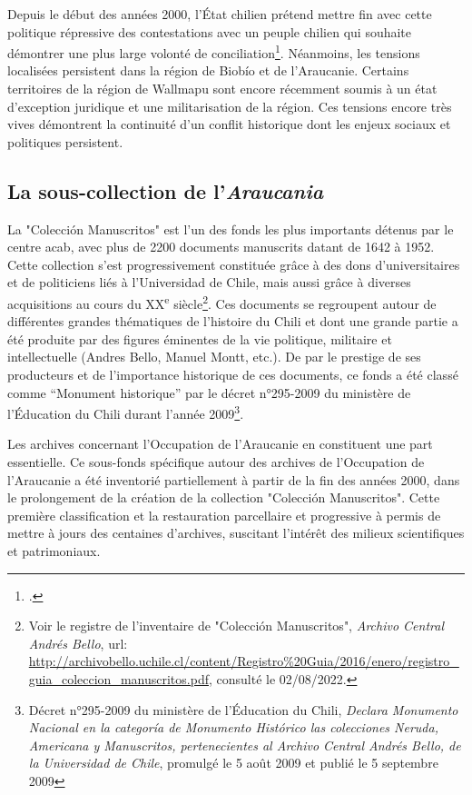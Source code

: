 	Depuis le début des années 2000, l'État chilien prétend mettre fin avec cette politique répressive des contestations avec un peuple chilien qui souhaite démontrer une plus large volonté de conciliation\footcite{nouailleIndependanceChiliConsequences2012}. Néanmoins, les tensions localisées persistent dans la région de Biobío et de l'Araucanie. Certains territoires de la région de Wallmapu sont encore récemment soumis à un état d'exception juridique et une militarisation de la région. Ces tensions encore très vives démontrent la continuité d'un conflit historique dont les enjeux sociaux et politiques persistent.
	    
    \subsection{La sous-collection de l'\textit{Araucania}}
    
    La "Colección Manuscritos" est l'un des fonds les plus importants détenus par le centre \gls{acab}, avec plus de 2200 documents manuscrits datant de 1642 à 1952. Cette collection s'est progressivement constituée grâce à des dons d'universitaires et de politiciens liés à l'Universidad de Chile, mais aussi grâce à diverses acquisitions au cours du XX\textsuperscript{e} siècle\footnote{Voir le registre de l'inventaire de "Colección Manuscritos", \textit{Archivo Central Andrés Bello}, url: \url{http://archivobello.uchile.cl/content/Registro\%20Guia/2016/enero/registro_guia_coleccion_manuscritos.pdf}, consulté le 02/08/2022.}. Ces documents se regroupent autour de différentes grandes thématiques de l'histoire du Chili et dont une grande partie a été produite par des figures éminentes de la vie politique, militaire et intellectuelle (Andres Bello, Manuel Montt, etc.). De par le prestige de ses producteurs et de l'importance historique de ces documents, ce fonds a été classé comme \enquote{Monument historique} par le décret n°295-2009 du ministère de l'Éducation du Chili durant l'année 2009\footnote{Décret n°295-2009 du ministère de l'Éducation du Chili, \textit{Declara Monumento Nacional en la categoría de Monumento Histórico las colecciones Neruda, Americana y Manuscritos, pertenecientes al Archivo Central Andrés Bello, de la Universidad de Chile}, promulgé le 5 août 2009 et publié le 5 septembre 2009}.\newpar
    
    Les archives concernant l'Occupation de l'Araucanie en constituent une part essentielle. Ce sous-fonds spécifique autour des archives de l'Occupation de l'Araucanie a été inventorié partiellement à partir de la fin des années 2000, dans le prolongement de la création de la collection "Colección Manuscritos". Cette première classification et la restauration parcellaire et progressive à permis de mettre à jours des centaines d'archives, suscitant l'intérêt des milieux scientifiques et patrimoniaux. 
    
